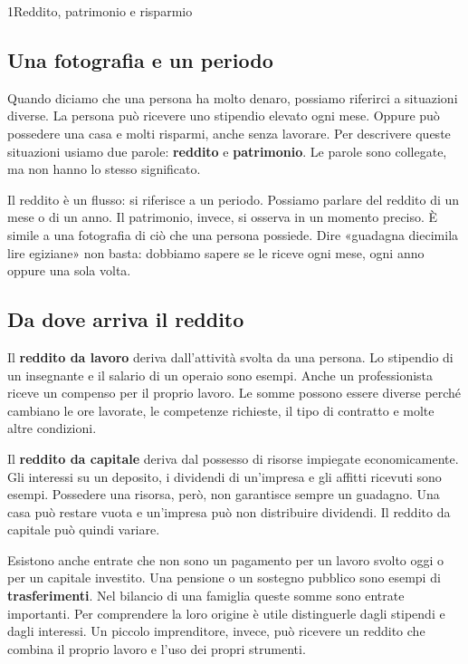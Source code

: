 \begin{lettura}{1}{Reddito, patrimonio e risparmio}


\subsection*{Una fotografia e un periodo}
Quando diciamo che una persona ha molto denaro, possiamo riferirci a situazioni diverse. La persona può ricevere uno stipendio elevato ogni mese. Oppure può possedere una casa e molti risparmi, anche senza lavorare. Per descrivere queste situazioni usiamo due parole: \textbf{reddito} e \textbf{patrimonio}. Le parole sono collegate, ma non hanno lo stesso significato.

Il reddito è un flusso: si riferisce a un periodo. Possiamo parlare del reddito di un mese o di un anno. Il patrimonio, invece, si osserva in un momento preciso. È simile a una fotografia di ciò che una persona possiede. Dire «guadagna diecimila lire egiziane» non basta: dobbiamo sapere se le riceve ogni mese, ogni anno oppure una sola volta.

\subsection*{Da dove arriva il reddito}
Il \textbf{reddito da lavoro} deriva dall'attività svolta da una persona. Lo stipendio di un insegnante e il salario di un operaio sono esempi. Anche un professionista riceve un compenso per il proprio lavoro. Le somme possono essere diverse perché cambiano le ore lavorate, le competenze richieste, il tipo di contratto e molte altre condizioni.

Il \textbf{reddito da capitale} deriva dal possesso di risorse impiegate economicamente. Gli interessi su un deposito, i dividendi di un'impresa e gli affitti ricevuti sono esempi. Possedere una risorsa, però, non garantisce sempre un guadagno. Una casa può restare vuota e un'impresa può non distribuire dividendi. Il reddito da capitale può quindi variare.

Esistono anche entrate che non sono un pagamento per un lavoro svolto oggi o per un capitale investito. Una pensione o un sostegno pubblico sono esempi di \textbf{trasferimenti}. Nel bilancio di una famiglia queste somme sono entrate importanti. Per comprendere la loro origine è utile distinguerle dagli stipendi e dagli interessi. Un piccolo imprenditore, invece, può ricevere un reddito che combina il proprio lavoro e l'uso dei propri strumenti.


\end{lettura}
